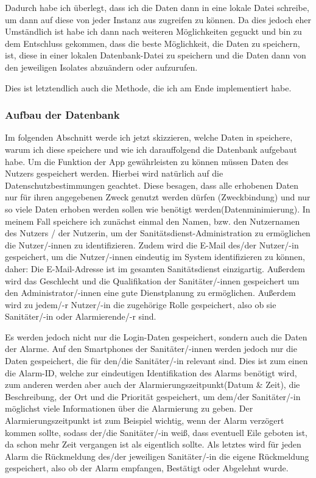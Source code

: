     \noindent Dadurch habe ich überlegt, dass ich die Daten dann in eine lokale Datei schreibe, um dann auf diese von jeder Instanz aus zugreifen zu können. Da dies jedoch eher Umständlich ist habe ich dann nach weiteren Möglichkeiten geguckt und bin zu dem Entschluss gekommen, dass die beste Möglichkeit, die Daten 
    zu speichern, ist, diese in einer lokalen Datenbank-Datei zu speichern und die Daten dann von den jeweiligen Isolates abzuändern oder aufzurufen.

    \noindent Dies ist letztendlich auch die Methode, die ich am Ende implementiert habe.
\subsubsection{Aufbau der Datenbank}

    Im folgenden Abschnitt werde ich jetzt skizzieren, welche Daten in speichere, warum ich diese speichere und wie ich darauffolgend die Datenbank aufgebaut habe.
    Um die Funktion der App gewährleisten zu können müssen Daten des Nutzers gespeichert werden. 
    Hierbei wird natürlich auf die Datenschutzbestimmungen geachtet.
    Diese besagen, dass alle erhobenen Daten nur für ihren angegebenen Zweck genutzt werden dürfen (Zweckbindung) und nur so viele Daten erhoben werden sollen wie benötigt werden(Datenminimierung)\cite{DSGVO}.
    In meinem Fall speichere ich zunächst einmal den Namen, bzw. den Nutzernamen des Nutzers / der Nutzerin, um der Sanitätsdienst-Administration zu ermöglichen die Nutzer/-innen zu identifizieren.
    Zudem wird die E-Mail des/der Nutzer/-in gespeichert, um die Nutzer/-innen eindeutig im System identifizieren zu können, daher: Die E-Mail-Adresse ist im gesamten Sanitätsdienst einzigartig.
    Außerdem wird das Geschlecht und die Qualifikation der Sanitäter/-innen gespeichert um den Administrator/-innen eine gute Dienstplanung zu ermöglichen.
    Außerdem wird zu jedem/-r Nutzer/-in die zugehörige Rolle gespeichert, also ob sie Sanitäter/-in oder Alarmierende/-r sind.
    
    \noindent Es werden jedoch nicht nur die Login-Daten gespeichert, sondern auch die Daten der Alarme. Auf den Smartphones der Sanitäter/-innen werden jedoch nur die Daten gespeichert, die für den/die Sanitäter/-in
    relevant sind. Dies ist zum einen die Alarm-ID, welche zur eindeutigen Identifikation des Alarms benötigt wird, zum anderen werden aber auch der Alarmierungszeitpunkt(Datum \& Zeit), die Beschreibung, der Ort und die Priorität gespeichert, um
    dem/der Sanitäter/-in möglichst viele Informationen über die Alarmierung zu geben. Der Alarmierungszeitpunkt ist zum Beispiel wichtig, wenn der Alarm verzögert kommen sollte, sodass der/die Sanitäter/-in weiß, dass eventuell Eile geboten ist, da schon mehr Zeit vergangen ist als eigentlich sollte.
    Als letztes wird für jeden Alarm die Rückmeldung des/der jeweiligen Sanitäter/-in die eigene Rückmeldung gespeichert, also ob der Alarm empfangen, Bestätigt oder Abgelehnt wurde.

